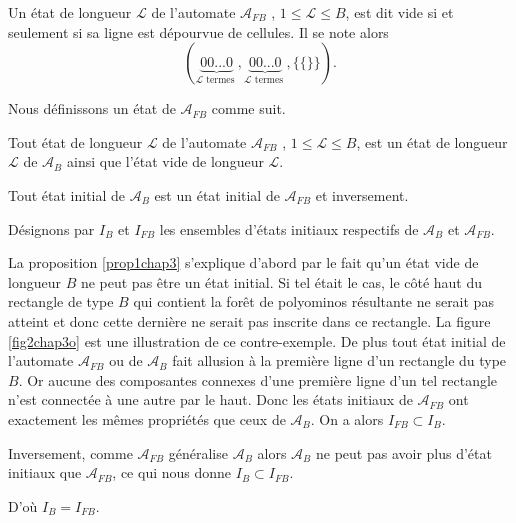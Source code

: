 \begin{Def}\label{etatvide}
Un état de longueur $\mathcal{L}$ de l'automate $\mathcal{A}_{FB}$ ,  $1\leq \mathcal{L}\leq B$, est dit vide  si et seulement si sa ligne est dépourvue de cellules. Il se note alors $$\displaystyle(\underbrace{00...0}_{\mathcal{L}\text{ termes }}, \underbrace{00...0}_{\mathcal{L}\text{ termes }},\{\{ \} \}).$$
\end{Def}
Nous définissons un état de $\mathcal{A}_{FB}$ comme suit. 
\begin{Def}\label{def1chp3}
Tout état de longueur $\mathcal{L}$ de l'automate $\mathcal{A}_{FB}$ ,  $1\leq \mathcal{L}\leq B$, est un état de longueur $\mathcal{L}$ de $\mathcal{A}_{B}$ ainsi que l'état vide de longueur $\mathcal{L}$.

\end{Def}
\begin{Prop}\label{prop1chap3}
Tout état initial de $\mathcal{A}_{B}$ est un état initial de $\mathcal{A}_{FB}$ et inversement.
\end{Prop}
\begin{Pre}
Désignons par $I_{B}$ et $I_{FB}$ les ensembles d'états initiaux respectifs de $\mathcal{A}_{B}$ et $\mathcal{A}_{FB}$.

La proposition \ref{prop1chap3} s'explique  d'abord par le fait qu'un état vide de longueur $B$ ne peut pas être un état initial. Si tel était le cas, le côté haut du rectangle de type $B$ qui contient la forêt de polyominos résultante ne serait pas atteint et donc cette dernière ne serait pas inscrite dans ce rectangle. La figure \ref{fig2chap3o}  est une  illustration de ce contre-exemple. De plus tout état initial de l'automate $\mathcal{A}_{FB}$  ou de $\mathcal{A}_{B}$  fait allusion à la première ligne d'un rectangle du type $B$. Or aucune des composantes connexes d'une première ligne d'un tel rectangle n'est connectée à une autre par le haut. Donc les états initiaux de $\mathcal{A}_{FB}$ ont exactement les mêmes propriétés que ceux de $\mathcal{A}_{B}$.  On a alors $I_{FB}\subset I_{B}$.

Inversement, comme $\mathcal{A}_{FB}$  généralise $\mathcal{A}_{B}$  alors $\mathcal{A}_{B}$ ne peut pas avoir plus d'état initiaux que $\mathcal{A}_{FB}$, ce  qui nous donne $I_{B}\subset I_{FB}$.

D'où   $I_{B}= I_{FB}$.
\end{Pre}
